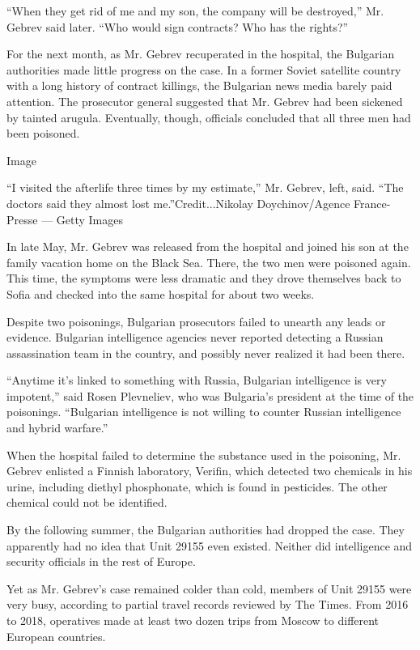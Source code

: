 ``When they get rid of me and my son, the company will be destroyed,''
Mr. Gebrev said later. ``Who would sign contracts? Who has the rights?''

For the next month, as Mr. Gebrev recuperated in the hospital, the
Bulgarian authorities made little progress on the case. In a former
Soviet satellite country with a long history of contract killings, the
Bulgarian news media barely paid attention. The prosecutor general
suggested that Mr. Gebrev had been sickened by tainted arugula.
Eventually, though, officials concluded that all three men had been
poisoned.

Image

``I visited the afterlife three times by my estimate,'' Mr. Gebrev,
left, said. ``The doctors said they almost lost me.''Credit...Nikolay
Doychinov/Agence France-Presse --- Getty Images

In late May, Mr. Gebrev was released from the hospital and joined his
son at the family vacation home on the Black Sea. There, the two men
were poisoned again. This time, the symptoms were less dramatic and they
drove themselves back to Sofia and checked into the same hospital for
about two weeks.

Despite two poisonings, Bulgarian prosecutors failed to unearth any
leads or evidence. Bulgarian intelligence agencies never reported
detecting a Russian assassination team in the country, and possibly
never realized it had been there.

``Anytime it's linked to something with Russia, Bulgarian intelligence
is very impotent,'' said Rosen Plevneliev, who was Bulgaria's president
at the time of the poisonings. ``Bulgarian intelligence is not willing
to counter Russian intelligence and hybrid warfare.''

When the hospital failed to determine the substance used in the
poisoning, Mr. Gebrev enlisted a Finnish laboratory, Verifin, which
detected two chemicals in his urine, including diethyl phosphonate,
which is found in pesticides. The other chemical could not be
identified.

By the following summer, the Bulgarian authorities had dropped the case.
They apparently had no idea that Unit 29155 even existed. Neither did
intelligence and security officials in the rest of Europe.

Yet as Mr. Gebrev's case remained colder than cold, members of Unit
29155 were very busy, according to partial travel records reviewed by
The Times. From 2016 to 2018, operatives made at least two dozen trips
from Moscow to different European countries.

